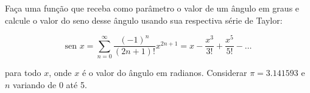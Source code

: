 
\question[10]

Faça uma função que receba como parâmetro o valor de um ângulo em graus e calcule o valor do seno desse ângulo usando sua respectiva série de Taylor:

\begin{equation*}
	\text{sen } x = \sum_{n=0}^{\infty} \frac{(-1)^n}{(2n+1)!}x^{2n+1} = x - \frac{x^3}{3!} + \frac{x^5}{5!} - \ldots 
\end{equation*}

para todo $x$, onde $x$  é o valor do ângulo em radianos. Considerar $\pi = 3.141593$ e $n$ variando de 0 até 5.